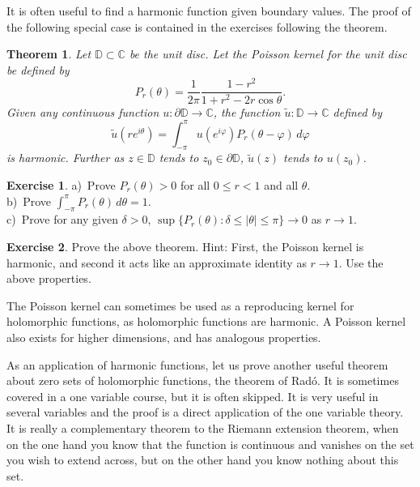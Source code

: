 \documentclass[12pt,openany]{book}
\newcommand{\abs}[1]{\left\lvert {#1} \right\rvert}
\newcommand{\C}{{\mathbb{C}}}
\newcommand{\D}{{\mathbb{D}}}
\newcommand{\myindex}[1]{#1\index{#1}}
\theoremstyle{plain}
\newtheorem{thm}{Theorem}[section]
\theoremstyle{remark}
\theoremstyle{definition}
\newenvironment{exbox}{%
    \def\FrameCommand{\vrule width 1pt \relax\hspace {10pt}}%
    \MakeFramed {\advance \hsize -\width \FrameRestore }%
}{%
    \endMakeFramed
}
\theoremstyle{exercise}
\newtheorem{exercise}{Exercise}[section]
\theoremstyle{example}
\begin{document}
It is often useful to find a harmonic function given boundary values.
The proof of the following special case is contained in the exercises
following the theorem.

\begin{thm}
Let $\D \subset \C$ be the unit disc.  Let the
\emph{\myindex{Poisson kernel}} for the unit disc be defined by
\begin{equation*}
P_r(\theta) = \frac{1}{2\pi} \frac{1-r^2}{1+r^2-2r \cos \theta} .
\end{equation*}
Given any continuous function $u \colon \partial \D \to \C$, the function
$\tilde{u} \colon \D \to \C$ defined by
\begin{equation}
\tilde{u}(re^{i\theta})
=
\int_{-\pi}^\pi u(e^{i\varphi}) P_r(\theta-\varphi) \, d\varphi
\end{equation}
is harmonic.  Further as $z \in \D$ tends to $z_0 \in \partial \D$,
$\tilde{u}(z)$ tends to $u(z_0)$.
\end{thm}

\begin{exbox}
\begin{exercise}
a)~Prove $P_r(\theta) > 0$ for all $0 \leq r < 1$ and all $\theta$.\\
b)~Prove $\int_{-\pi}^{\pi} P_r(\theta) \, d\theta = 1$.\\
c)~Prove for any given $\delta > 0$,
$\sup \{P_r(\theta) : \delta \leq \abs{\theta} \leq \pi \} \to 0$ as
$r \to 1$.
\end{exercise}

\begin{exercise}
Prove the above theorem.  Hint: First, the Poisson kernel is harmonic,
and second it acts like an
approximate identity as $r \to 1$.  Use the above properties.
\end{exercise}
\end{exbox}

The Poisson kernel can sometimes be used as a reproducing kernel for
holomorphic functions, as holomorphic functions are harmonic.
A Poisson kernel also exists for higher dimensions, and has
analogous properties.

As an application of harmonic functions, let us prove 
another useful theorem about zero sets of holomorphic functions,
the theorem of
Rad\'o.  It is sometimes covered in a one variable course, but it is often
skipped.  It is very useful in several variables and the proof is a direct
application of the one
variable theory.  It is really a complementary theorem to the
Riemann extension theorem, when on the one hand you know that the function is
continuous and vanishes on the set you wish to extend across, but on the
other hand you know nothing about this set.
\end{document}
